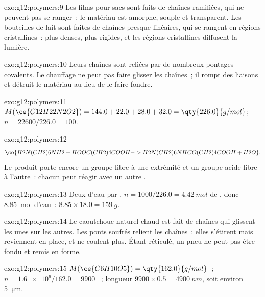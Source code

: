 \begin{solution}{exo:g12:polymers:9}
Les films pour sacs sont faits de chaînes ramifiées, qui ne peuvent pas
se ranger~: le matériau est amorphe, souple et transparent. Les
bouteilles de lait sont faites de chaînes presque linéaires, qui se
rangent en régions cristallines~: plus denses, plus rigides, et les
régions cristallines diffusent la lumière.
\end{solution}

\begin{solution}{exo:g12:polymers:10}
Leurs chaînes sont reliées par de nombreux pontages covalents. Le
chauffage ne peut pas faire glisser les chaînes~; il rompt des liaisons
et détruit le matériau au lieu de le faire fondre.
\end{solution}

\begin{solution}{exo:g12:polymers:11}
$M(\ce{C12H22N2O2}) = 144.0 + 22.0 + 28.0 + 32.0 = \qty{226.0}{g/mol}$;
$n = 22600/226.0 = 100$.
\end{solution}

\begin{solution}{exo:g12:polymers:12}
\[
  \ce{H2N(CH2)6NH2 + HOOC(CH2)4COOH -> H2N(CH2)6NHCO(CH2)4COOH + H2O} .
\]
Le produit porte encore un groupe  libre à une extrémité et un
groupe acide libre à l'autre~: chacun peut réagir avec un autre
.
\end{solution}

\begin{solution}{exo:g12:polymers:13}
Deux  d'eau par . $n = 1000/226.0 =
\qty{4.42}{mol}$ de , donc \qty{8.85}{mol} d'eau~:
$8.85 \times 18.0 = \qty{159}{g}$.
\end{solution}

\begin{solution}{exo:g12:polymers:14}
Le caoutchouc naturel chaud est fait de chaînes qui glissent les unes
sur les autres. Les ponts soufrés relient les chaînes~: elles s'étirent
mais reviennent en place, et ne coulent plus. Étant réticulé, un pneu ne
peut pas être fondu et remis en forme.
\end{solution}

\begin{solution}{exo:g12:polymers:15}
$M(\ce{C6H10O5}) = \qty{162.0}{g/mol}$~; $n = \num{1.6e6}/162.0 = 9900$
~; longueur $9900 \times 0.5 = \qty{4900}{nm}$, soit environ
\qty{5}{\micro m}.
\end{solution}

